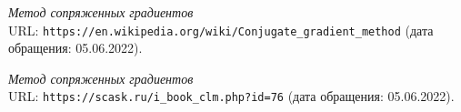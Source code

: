 \begin{thebibliography}{99}

{\itshape Метод сопряженных градиентов} \\URL: \texttt{https://en.wikipedia.org/wiki/Conjugate_gradient_method} (дата обращения: 05.06.2022).

{\itshape Метод сопряженных градиентов} \\URL: \texttt{https://scask.ru/i_book_clm.php?id=76} (дата обращения: 05.06.2022).

\end{thebibliography}
\pagebreak
